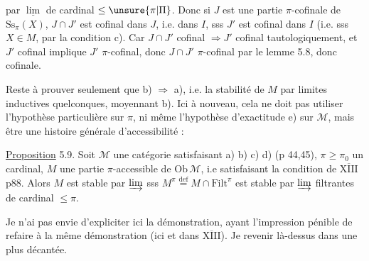 
par $\underline{\lim}$ de cardinal $\leq\unsure{\pi|\Pi}$. Donc si $J$ est une partie $\pi$-cofinale de $\mathrm{Ss}_{\pi}(X)$, $J\cap J'$ est cofinal dans $J$, i.e. dans $I$, sss $J'$ \deleted{\unsure{$\in$}} est  cofinal dans $I$ (i.e. sss $X\in M$, par la condition c). Car $J\cap J'$ cofinal $\Rightarrow J'$ cofinal tautologiquement, et $J'$ cofinal implique $J'$ $\pi$-cofinal, donc $J\cap J'$ $\pi$-cofinal par le lemme 5.8, donc cofinale.

Reste à prouver seulement que b) $\Rightarrow$ a), i.e. la stabilité de $M$ par limites inductives  quelconques, moyennant  b). Ici à nouveau, cela ne doit pas utiliser l'hypothèse particulière sur $\pi$, ni même l'hypothèse d'exactitude e) sur $\mathcal M$, mais être une histoire générale d'accessibilité :

\uline{Proposition} 5.9. Soit $\mathcal M$ une  catégorie satisfaisant a) b) c) d) (p 44,45), $\pi\geq\pi_0$ un cardinal, $M$ une partie $\pi$-accessible de $\mathrm{Ob}\,\mathcal M$, i.e satisfaisant la condition  de \uline{$\overline{\mathrm{XIII}}$} p88. Alors $M$ est stable par $\varinjlim$  sss $M^\pi\overset{\mathrm{def}}=M\cap\mathrm{Filt}^{\pi}$ est stable par $\varinjlim$ filtrantes de cardinal $\leq\pi$.

Je n'ai pas envie d'expliciter ici la démonstration, ayant l'impression pénible de refaire à  la même démonstration (ici et dans \uline{$\overline{\mathrm{XIII}}$}). Je  revenir là-dessus dans une  plus décantée.

